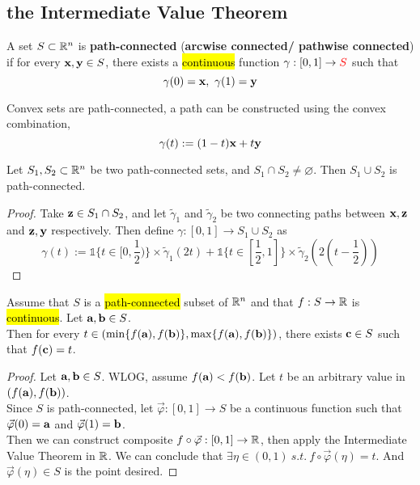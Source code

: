 \documentclass[11pt]{article}
\newcommand{\vex}[0]{\ve{x}}
\newcommand{\vey}[0]{\ve{y}}
\newcommand{\vea}[0]{\ve{a}}
\newcommand{\veb}[0]{\ve{b}}
\begin{document}
		\subsection{the Intermediate Value Theorem}
			\begin{definition}
				A set $S \subset \mathbb{R}^n$ is \textbf{path-connected} (\textbf{arcwise connected/ pathwise connected}) if for every $\vex, \vey \in S$, there exists a \hl{continuous} function $\gamma: [0, 1] \to \textcolor{red}{S}$ such that
				\begin{equation}
					\gamma(0) = \vex,\ \gamma(1) = \vey
				\end{equation}
			\end{definition}
			
			\begin{example}
				Convex sets are path-connected, a path can be constructed using the convex combination,
				\begin{equation}
					\gamma(t) := (1 - t) \vex + t \vey
				\end{equation}
			\end{example}
			
			\begin{proposition}
				Let $S_1, S_2 \subset \mathbb{R}^n$ be two path-connected sets, and $S_1 \cap S_2 \neq \varnothing$. Then $S_1 \cup S_2$ is path-connected.
				\begin{proof}
					Take $\textbf{z} \in S_1 \cap S_2$, and let $\tilde{\gamma}_1$ and $\tilde{\gamma}_2$ be two connecting paths between $\vex, \ve{z}$ and $\ve{z}, \vey$ respectively. Then define $\gamma: [0, 1] \to S_1 \cup S_2$ as 
					\begin{equation}
						\gamma(t) := \mathds{1}\{t \in [0, \frac{1}{2})\} \times \tilde{\gamma}_1(2t) + \mathds{1}\{t \in [\frac{1}{2}, 1]\} \times \tilde{\gamma}_2(2(t-\frac{1}{2}))
					\end{equation}
				\end{proof}
			\end{proposition}
			
			\begin{theorem}
				Assume that $S$ is a \hl{path-connected} subset of $\mathbb{R}^n$ and that $f: S \to \mathbb{R}$ is \hl{continuous}. Let $\vea, \veb \in S$.\\
				Then for every $t \in (\min\{f(\vea), f(\veb)\}, \max\{f(\vea), f(\veb)\})$, there exists $\textbf{c} \in S$ such that $f(\textbf{c}) = t$.
				\begin{proof}
					Let $\vea, \veb \in S$. WLOG, assume $f(\vea) < f(\veb)$. Let $t$ be an arbitrary value in $(f(\vea), f(\veb))$.\\
					Since $S$ is path-connected, let $\vec{\varphi}: [0, 1] \to S$ be a continuous function such that $\vec{\varphi}(0) = \vea$ and $\vec{\varphi}(1) = \veb$. \\
					Then we can construct composite $f \circ \vec{\varphi}: [0, 1] \to \mathbb{R}$, then apply the Intermediate Value Theorem in $\mathbb{R}$. We can conclude that $\exists \eta \in (0,1)\ s.t.\ f \circ \vec{\varphi}(\eta) = t$. And $\vec{\varphi}(\eta) \in S$ is the point desired.
				\end{proof}
			\end{theorem}
			
\end{document}
